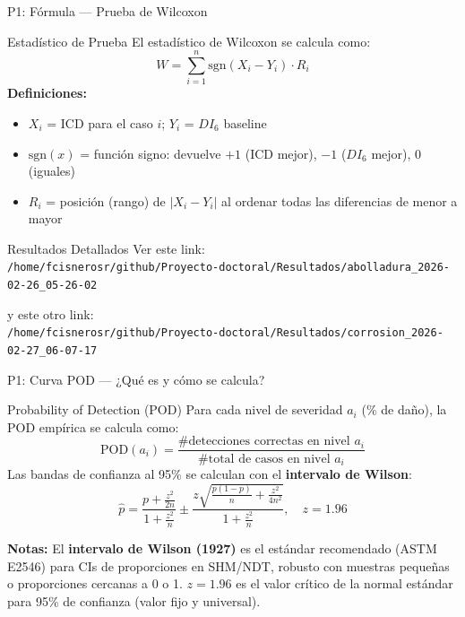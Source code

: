 \documentclass{beamer}
\begin{document}
\begin{frame}{P1: Fórmula — Prueba de Wilcoxon}
    \footnotesize
    \begin{block}{Estadístico de Prueba}
        El estadístico de Wilcoxon se calcula como:
        \begin{equation*}
            W = \sum_{i=1}^{n} \text{sgn}(X_i - Y_i) \cdot R_i
        \end{equation*}
        \vspace{0.25cm}
        \textbf{Definiciones:}
        \begin{itemize} \footnotesize
            \item $X_i$ = ICD para el caso $i$; $Y_i$ = $DI_6$ baseline
            \item $\text{sgn}(x)$ = función signo: devuelve $+1$ (ICD mejor), $-1$ ($DI_6$ mejor), $0$ (iguales)
            \item $R_i$ = posición (rango) de $|X_i - Y_i|$ al ordenar todas las diferencias de menor a mayor
        \end{itemize}
    \end{block}

    \vspace{0.15cm}

    \begin{block}{Resultados Detallados}
        \tiny
        Ver este link: \\
        \texttt{/home/fcisnerosr/github/Proyecto-doctoral/Resultados/abolladura\_2026-02-26\_05-26-02}

        y este otro link: \\
        \texttt{/home/fcisnerosr/github/Proyecto-doctoral/Resultados/corrosion\_2026-02-27\_06-07-17}
    \end{block}
\end{frame}

\begin{frame}{P1: Curva POD — ¿Qué es y cómo se calcula?}
    \small
    \begin{block}{Probability of Detection (POD)}
        Para cada nivel de severidad $a_i$ (\% de daño), la POD empírica se calcula como:
        \begin{equation*}
            \text{POD}(a_i) = \frac{\text{\# detecciones correctas en nivel } a_i}{\text{\# total de casos en nivel } a_i}
        \end{equation*}
        Las bandas de confianza al 95\% se calculan con el \textbf{intervalo de Wilson}:
        \begin{equation*}
            \hat{p} = \frac{p + \frac{z^2}{2n}}{1 + \frac{z^2}{n}} \pm \frac{z\sqrt{\frac{p(1-p)}{n} + \frac{z^2}{4n^2}}}{1 + \frac{z^2}{n}}, \quad z = 1.96
        \end{equation*}
    \end{block}
    \vspace{0.15cm}
    \footnotesize
    \textbf{Notas:} El \textbf{intervalo de Wilson (1927)} es el estándar recomendado (ASTM E2546) para CIs de proporciones en SHM/NDT, robusto con muestras pequeñas o proporciones cercanas a 0 o 1. \quad $z=1.96$ es el valor crítico de la normal estándar para 95\% de confianza (valor fijo y universal).
\end{frame}
\end{document}
